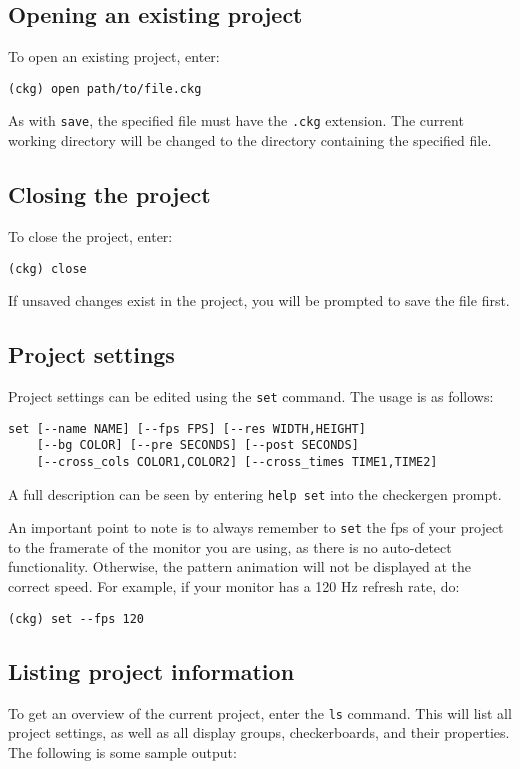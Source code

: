 \documentclass[12pt,titlepage]{article}
\begin{document}
\subsection{Opening an existing project}
To open an existing project, enter:
\begin{lstlisting}
(ckg) open path/to/file.ckg
\end{lstlisting}
As with \texttt{save}, the specified file must have the \texttt{.ckg}
extension. The current working directory will be changed to the
directory containing the specified file.

\subsection{Closing the project}
To close the project, enter:
\begin{lstlisting}
(ckg) close
\end{lstlisting}
If unsaved changes exist in the project, you will be prompted to save
the file first.

\subsection{Project settings}

Project settings can be edited using the \texttt{set} command. The
usage is as follows:
\begin{lstlisting}
set [--name NAME] [--fps FPS] [--res WIDTH,HEIGHT]
    [--bg COLOR] [--pre SECONDS] [--post SECONDS] 
    [--cross_cols COLOR1,COLOR2] [--cross_times TIME1,TIME2]
\end{lstlisting}
A full description can be seen by entering \lstinline{help set} into
the checkergen prompt.

An important point to note is to always remember to \texttt{set} the
fps of your project to the framerate of the monitor you are using, as
there is no auto-detect functionality. Otherwise, the pattern
animation will not be displayed at the correct speed. For example, if
your monitor has a 120 Hz refresh rate, do:
\begin{lstlisting}
(ckg) set --fps 120
\end{lstlisting}

\subsection{Listing project information}

To get an overview of the current project, enter the \texttt{ls}
command. This will list all project settings, as well as all display
groups, checkerboards, and their properties. The following is some
sample output:
\end{document}
